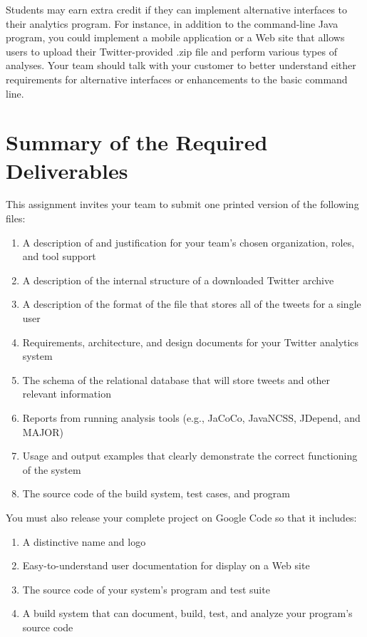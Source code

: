 Students may earn extra credit if they can implement alternative interfaces to their analytics program.  For instance, in
addition to the command-line Java program, you could implement a mobile application or a Web site that allows users to
upload their Twitter-provided .zip file and perform various types of analyses. Your team should talk with your customer
to better understand either requirements for alternative interfaces or enhancements to the basic command line. 

\section*{Summary of the Required Deliverables}

This assignment invites your team to submit one printed version of the following files:
\vspace*{-.1in}
\begin{enumerate}
	\itemsep0em 
	\item A description of and justification for your team's chosen organization, roles, and tool support
	\item A description of the internal structure of a downloaded Twitter archive
	\item A description of the format of the file that stores all of the tweets for a single user
	\item Requirements, architecture, and design documents for your Twitter analytics system
	\item The schema of the relational database that will store tweets and other relevant information
	\item Reports from running analysis tools (e.g., JaCoCo, JavaNCSS, JDepend, and MAJOR) 
	\item Usage and output examples that clearly demonstrate the correct functioning of the system
	\item The source code of the build system, test cases, and program
\end{enumerate}
You must also release your complete project on Google Code so that it includes:
\vspace*{-.1in}

\begin{enumerate}
		\itemsep0em 
		\item A distinctive name and logo
		\item Easy-to-understand user documentation for display on a Web site
		\item The source code of your system's program and test suite
		\item A build system that can document, build, test, and analyze your program's source code
	\end{enumerate}

